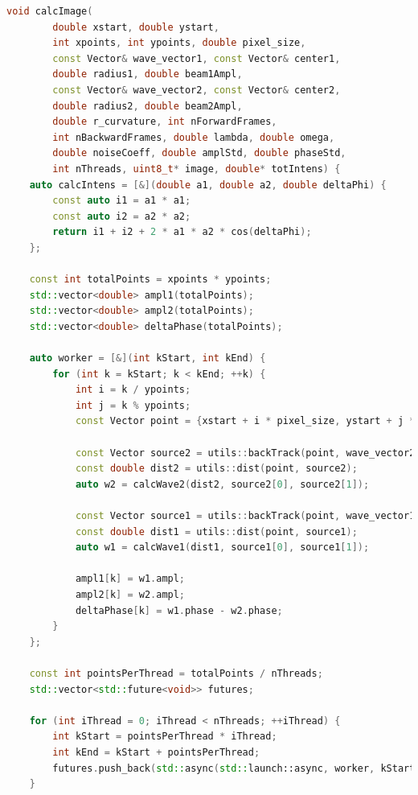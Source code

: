 \captiondelim{ } %
\begin{lstlisting}[language=C++,tabsize=4,label={lst:calcImage},caption={Листинг функции вычисления интерференционной картины}]
void calcImage(
		double xstart, double ystart, 
		int xpoints, int ypoints, double pixel_size,
		const Vector& wave_vector1, const Vector& center1, 
		double radius1, double beam1Ampl,
        const Vector& wave_vector2, const Vector& center2, 
        double radius2, double beam2Ampl, 
        double r_curvature, int nForwardFrames, 
        int nBackwardFrames, double lambda, double omega, 
        double noiseCoeff, double amplStd, double phaseStd,
        int nThreads, uint8_t* image, double* totIntens) {
    auto calcIntens = [&](double a1, double a2, double deltaPhi) {
        const auto i1 = a1 * a1;
        const auto i2 = a2 * a2;
        return i1 + i2 + 2 * a1 * a2 * cos(deltaPhi);
    };

    const int totalPoints = xpoints * ypoints;
    std::vector<double> ampl1(totalPoints);
    std::vector<double> ampl2(totalPoints);
    std::vector<double> deltaPhase(totalPoints);

    auto worker = [&](int kStart, int kEnd) {
        for (int k = kStart; k < kEnd; ++k) {
		    int i = k / ypoints;
		    int j = k % ypoints;
		    const Vector point = {xstart + i * pixel_size, ystart + j * pixel_size, 0};

            const Vector source2 = utils::backTrack(point, wave_vector2, center2);
            const double dist2 = utils::dist(point, source2);
            auto w2 = calcWave2(dist2, source2[0], source2[1]);

            const Vector source1 = utils::backTrack(point, wave_vector1, center1);
            const double dist1 = utils::dist(point, source1);
	        auto w1 = calcWave1(dist1, source1[0], source1[1]);
	        
            ampl1[k] = w1.ampl;
            ampl2[k] = w2.ampl;
            deltaPhase[k] = w1.phase - w2.phase;
		}
	};

	const int pointsPerThread = totalPoints / nThreads;
	std::vector<std::future<void>> futures;

	for (int iThread = 0; iThread < nThreads; ++iThread) {
		int kStart = pointsPerThread * iThread;
		int kEnd = kStart + pointsPerThread;
		futures.push_back(std::async(std::launch::async, worker, kStart, kEnd));
	}


\end{lstlisting}
